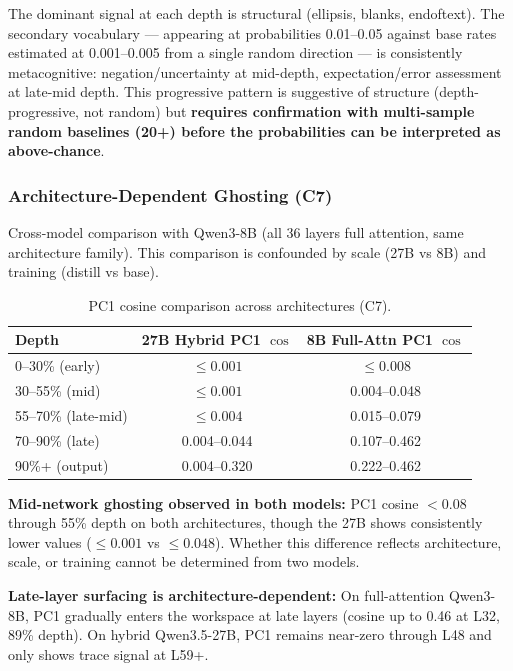 \documentclass[11pt,a4paper]{article}
\begin{document}
The dominant signal at each depth is structural (ellipsis, blanks, endoftext). The secondary vocabulary --- appearing at probabilities 0.01--0.05 against base rates estimated at 0.001--0.005 from a single random direction --- is consistently metacognitive: negation/uncertainty at mid-depth, expectation/error assessment at late-mid depth. This progressive pattern is suggestive of structure (depth-progressive, not random) but \textbf{requires confirmation with multi-sample random baselines (20+) before the probabilities can be interpreted as above-chance}.

\subsubsection{Architecture-Dependent Ghosting (C7)}

Cross-model comparison with Qwen3-8B (all 36 layers full attention, same architecture family). This comparison is confounded by scale (27B vs 8B) and training (distill vs base).

\begin{table}[H]
\centering
\caption{PC1 cosine comparison across architectures (C7).}
\label{tab:arch-compare}
\begin{tabular}{lcc}
\toprule
Depth & 27B Hybrid PC1 $\cos$ & 8B Full-Attn PC1 $\cos$ \\
\midrule
0--30\% (early)     & $\leq 0.001$ & $\leq 0.008$ \\
30--55\% (mid)      & $\leq 0.001$ & 0.004--0.048 \\
55--70\% (late-mid) & $\leq 0.004$ & 0.015--0.079 \\
70--90\% (late)     & 0.004--0.044 & 0.107--0.462 \\
90\%+ (output)      & 0.004--0.320 & 0.222--0.462 \\
\bottomrule
\end{tabular}
\end{table}

\textbf{Mid-network ghosting observed in both models:} PC1 cosine $< 0.08$ through 55\% depth on both architectures, though the 27B shows consistently lower values ($\leq 0.001$ vs $\leq 0.048$). Whether this difference reflects architecture, scale, or training cannot be determined from two models.

\textbf{Late-layer surfacing is architecture-dependent:} On full-attention Qwen3-8B, PC1 gradually enters the workspace at late layers (cosine up to 0.46 at L32, 89\% depth). On hybrid Qwen3.5-27B, PC1 remains near-zero through L48 and only shows trace signal at L59+.
\end{document}
